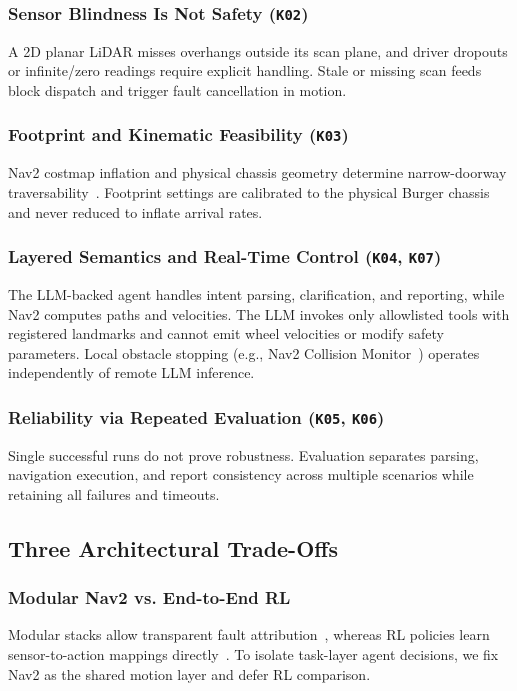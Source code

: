 \documentclass[conference,a4paper]{IEEEtran}
\begin{document}
\subsubsection{Sensor Blindness Is Not Safety (\texttt{K02})}
A 2D planar LiDAR misses overhangs outside its scan plane, and driver dropouts or infinite/zero readings require explicit handling. Stale or missing scan feeds block dispatch and trigger fault cancellation in motion.

\subsubsection{Footprint and Kinematic Feasibility (\texttt{K03})}
Nav2 costmap inflation and physical chassis geometry determine narrow-doorway traversability~\cite{b9}. Footprint settings are calibrated to the physical Burger chassis and never reduced to inflate arrival rates.

\subsubsection{Layered Semantics and Real-Time Control (\texttt{K04}, \texttt{K07})}
The LLM-backed agent handles intent parsing, clarification, and reporting, while Nav2 computes paths and velocities. The LLM invokes only allowlisted tools with registered landmarks and cannot emit wheel velocities or modify safety parameters. Local obstacle stopping (e.g., Nav2 Collision Monitor~\cite{b11}) operates independently of remote LLM inference.

\subsubsection{Reliability via Repeated Evaluation (\texttt{K05}, \texttt{K06})}
Single successful runs do not prove robustness. Evaluation separates parsing, navigation execution, and report consistency across multiple scenarios while retaining all failures and timeouts.

\subsection{Three Architectural Trade-Offs}

\subsubsection{Modular Nav2 vs. End-to-End RL}
Modular stacks allow transparent fault attribution~\cite{b4}, whereas RL policies learn sensor-to-action mappings directly~\cite{b7}. To isolate task-layer agent decisions, we fix Nav2 as the shared motion layer and defer RL comparison.
\end{document}

